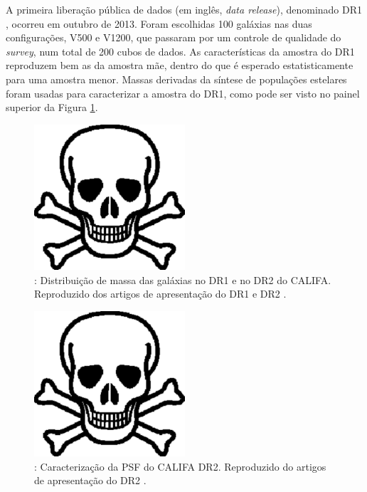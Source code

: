 A primeira liberação pública de dados (em inglês, {\em data release}),
denominado DR1 \citep{Husemann2013}, ocorreu em outubro de 2013\fixme. Foram
escolhidas 100 galáxias nas duas configurações, V500 e V1200, que passaram por
um controle de qualidade do {\em survey}, num total de 200 cubos de dados. As
características da amostra do DR1 reproduzem bem as da amostra mãe, dentro do
que é esperado estatisticamente para uma amostra menor. Massas derivadas da
síntese de populações estelares foram usadas para caracterizar a amostra do DR1,
como pode ser visto no painel superior da Figura \ref{fig:DRMass}.

\begin{figure}
	\includegraphics[width=0.5\textwidth]{figuras/test.pdf}
	\caption[Distribuição de massa das galáxias (CALIFA DR1 e DR2).]
	{\TODO: Distribuição de massa das galáxias no DR1 e no DR2 do CALIFA.
	Reproduzido dos artigos de apresentação do DR1 \citep[figura 6]{Husemann2013}
	e DR2 \citep[figura 7]{GarciaBenito2015}.}
	\label{fig:DRMass}
\end{figure}

\begin{figure}
	\includegraphics[width=0.5\textwidth]{figuras/test.pdf}
	\caption[Caracterização da PSF do CALIFA DR2.]
	{\TODO: Caracterização da PSF do CALIFA DR2.
	Reproduzido do artigos de apresentação do DR2 \citep[figura
	13]{GarciaBenito2015}.}
	\label{fig:DR2PSF}
\end{figure}

